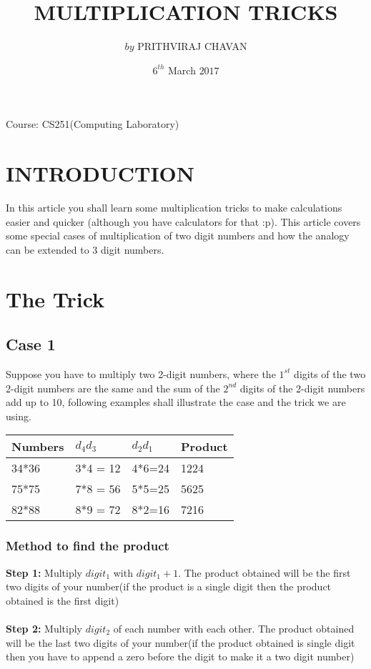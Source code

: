 \documentclass[12pt, a4paper]{article}
\title{MULTIPLICATION TRICKS}
\author{$by$ PRITHVIRAJ CHAVAN}
\date{$6^{th}$ March $2017$}
\begin{document}
	\begin{titlepage}
		\maketitle
		\vfill
		\begin{center}
			Course: CS251(Computing Laboratory)
		\end{center}
	\end{titlepage}
	\tableofcontents
	\newpage
	\section{INTRODUCTION}
	In this article you shall learn some multiplication tricks to make calculations easier and quicker (although you have calculators for that :p). This article covers some special cases of multiplication of two digit numbers and how the analogy can be extended to 3 digit numbers.
	\section{The Trick}
	\subsection{Case 1}
	\label{1}
	Suppose you have to multiply two 2-digit numbers, where the $1^{st}$ digits of the two 2-digit numbers are the same and the sum of the $2^{nd}$ digits of the 2-digit numbers add up to 10, 
	following examples shall illustrate the case and the trick we are using.
	
	\begin{flushleft}
		\begin{tabular}{ |m{2.5cm}|m{2.5cm}|m{2.5cm}|m{2.5cm}| }
			\hline
			Numbers & $d_4d_3$ & $d_2d_1$ & Product\\ \hline
			34*36 & 3*4 = 12 & 4*6=24 & 1224\\ \hline
			75*75 & 7*8 = 56 & 5*5=25 & 5625\\ \hline
			82*88 & 8*9 = 72 & 8*2=16 & 7216\\
			\hline  	
		\end{tabular}
	\end{flushleft}
	\subsubsection{Method to find the product}
	\textbf{Step 1:} Multiply $digit_1$ with $digit_1+1$. The product obtained will be the first two digits of your number(if the product is a single digit then the product obtained is the first digit)\\\\
	\textbf{Step 2:} Multiply $digit_2$ of each number with each other. The product obtained will be the last two digits of your number(if the product obtained is single digit then you have to append a zero before the digit to make it a two digit number)
\end{document}
